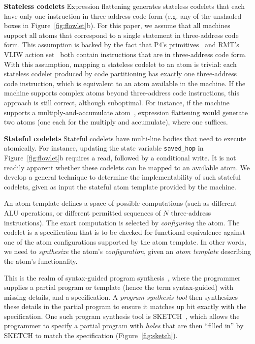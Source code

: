 \textbf{Stateless codelets}
Expression flattening generates stateless codelets that each have only one
instruction in three-address code form (e.g. any of the unshaded boxes in
Figure~\ref{fig:flowlet}b). For this paper, we assume that all \absmachine
machines support all atoms that correspond to a single statement in
three-address code form. This assumption is backed by the fact that P4's
primitives~\cite{p4spec} and RMT's VLIW action set~\cite{rmt} both contain
instructions that are in three-address code form. With this assumption, mapping
a stateless codelet to an atom is trivial: each stateless codelet produced by
code partitioning has exactly one three-address code instruction, which is
equivalent to an atom available in the \absmachine machine. If the \absmachine
machine supports complex atoms beyond three-address code instructions, this
approach is still correct, although suboptimal. For instance, if the
\absmachine machine supports a multiply-and-accumulate atom~\cite{mac},
expression flattening would generate two atoms (one each for the multiply and
accumulate), where one suffices.

\textbf{Stateful codelets}
Stateful codelets have multi-line bodies that need to execute atomically. For
instance, updating the state variable \texttt{saved\_hop} in
Figure~\ref{fig:flowlet}b requires a read, followed by a conditional write.  It
is not readily apparent whether these codelets can be mapped to an available
atom. We develop a general technique to determine the implementability of such
stateful codelets, given as input the stateful atom template provided by the
\absmachine machine.

An atom template defines a space of possible computations (such as different
ALU operations, or different permitted sequences of $N$ three-address
instructions).  The exact computation is selected by \textit{configuring} the
atom. The codelet is a specification that is to be checked for functional
equivalence against one of the atom configurations supported by the atom
template. In other words, we need to \textit{synthesize} the atom's
\textit{configuration}, given an \textit{atom template} describing the atom's
functionality.

This is the realm of syntax-guided program synthesis~\cite{sgsyn}, where the
programmer supplies a partial program or template (hence the term
syntax-guided) with missing details, and a specification. A \textit{program synthesis
tool} then synthesizes these details in the partial program to ensure it matches
up bit exactly with the specification. One such program synthesis tool is
SKETCH~\cite{bitstreaming, sketch_asplos, sketch_manual}, which allows the
programmer to specify a partial program with \textit{holes} that are then
``filled in'' by SKETCH to match the specification
(Figure~\ref{fig:sketch}).


